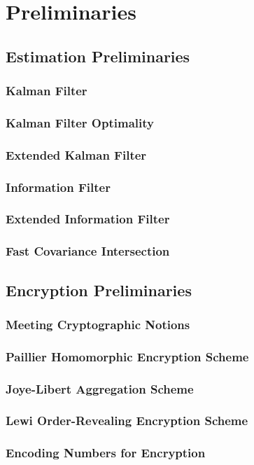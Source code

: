 
\chapter{Preliminaries}
\section{Estimation Preliminaries}
\subsection{Kalman Filter}
\subsection{Kalman Filter Optimality}
\subsection{Extended Kalman Filter}
\subsection{Information Filter}
\subsection{Extended Information Filter}
\subsection{Fast Covariance Intersection}
\section{Encryption Preliminaries}
\subsection{Meeting Cryptographic Notions}
\subsection{Paillier Homomorphic Encryption Scheme}
\subsection{Joye-Libert Aggregation Scheme}
\subsection{Lewi Order-Revealing Encryption Scheme}
\subsection{Encoding Numbers for Encryption}